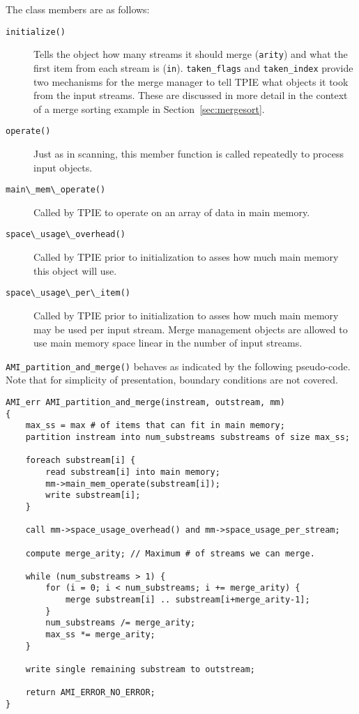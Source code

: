 The class members are as follows:

\begin{description}
\item[\verb|initialize()|] Tells the object how many streams it should
  merge (\verb|arity|) and what the first item from each stream is
  (\verb|in|). \verb|taken_flags| and \verb|taken_index| provide two
  mechanisms for the merge manager to tell TPIE what objects it took
  from the input streams. These are discussed in more detail in 
  the context of a merge sorting example in Section~\ref{sec:mergesort}.
\item[\verb|operate()|]
Just as in scanning, this member function is called repeatedly to process
input objects.
\item[\verb|main\_mem\_operate()|]
Called by TPIE to operate on an array of data in main memory.
\item[\verb|space\_usage\_overhead()|]
Called by TPIE prior to initialization to asses how much main memory this
object will use.
\item[\verb|space\_usage\_per\_item()|]
Called by TPIE prior to initialization to asses how much main memory may be
used per input stream. Merge management objects are allowed to use main
memory space linear in the number of input streams.
\end{description}

\verb|AMI_partition_and_merge()| behaves as indicated by the following
pseudo-code. Note that for simplicity of presentation, boundary conditions are not covered.

\begin{verbatim}
AMI_err AMI_partition_and_merge(instream, outstream, mm)
{
    max_ss = max # of items that can fit in main memory;
    partition instream into num_substreams substreams of size max_ss;

    foreach substream[i] {
        read substream[i] into main memory;
        mm->main_mem_operate(substream[i]);
        write substream[i];
    }

    call mm->space_usage_overhead() and mm->space_usage_per_stream;
    
    compute merge_arity; // Maximum # of streams we can merge.     

    while (num_substreams > 1) {
        for (i = 0; i < num_substreams; i += merge_arity) {
            merge substream[i] .. substream[i+merge_arity-1];
        }
        num_substreams /= merge_arity;
        max_ss *= merge_arity;
    }

    write single remaining substream to outstream;
        
    return AMI_ERROR_NO_ERROR;
}
\end{verbatim}


